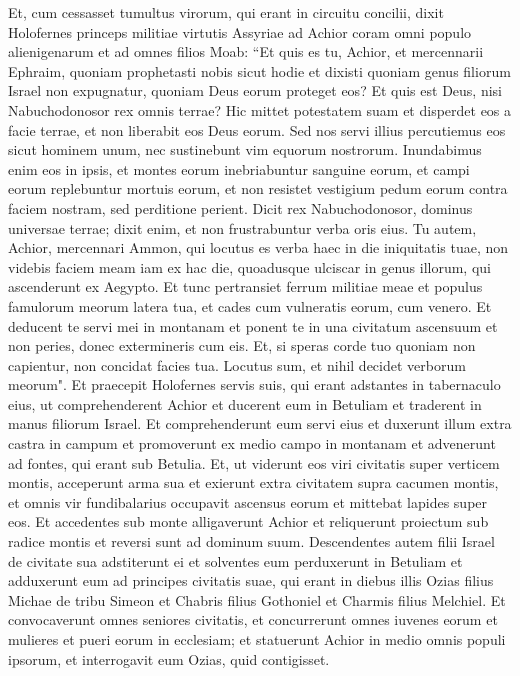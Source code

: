 \begin{biblechapter}  
\verse Et, cum cessasset tumultus virorum, qui erant in circuitu concilii, dixit Holofernes princeps militiae virtutis Assyriae ad Achior coram omni populo alienigenarum et ad omnes filios Moab: 
\verse “Et quis es tu, Achior, et mercennarii Ephraim, quoniam prophetasti nobis sicut hodie et dixisti quoniam genus filiorum Israel non expugnatur, quoniam Deus eorum proteget eos? Et quis est Deus, nisi Nabuchodonosor rex omnis terrae? Hic mittet potestatem suam et disperdet eos a facie terrae, et non liberabit eos Deus eorum. 
\verse Sed nos servi illius percutiemus eos sicut hominem unum, nec sustinebunt vim equorum nostrorum. 
\verse Inundabimus enim eos in ipsis, et montes eorum inebriabuntur sanguine eorum, et campi eorum replebuntur mortuis eorum, et non resistet vestigium pedum eorum contra faciem nostram, sed perditione perient. Dicit rex Nabuchodonosor, dominus universae terrae; dixit enim, et non frustrabuntur verba oris eius. 
\verse Tu autem, Achior, mercennari Ammon, qui locutus es verba haec in die iniquitatis tuae, non videbis faciem meam iam ex hac die, quoadusque ulciscar in genus illorum, qui ascenderunt ex Aegypto. 
\verse Et tunc pertransiet ferrum militiae meae et populus famulorum meorum latera tua, et cades cum vulneratis eorum, cum venero. 
\verse Et deducent te servi mei in montanam et ponent te in una civitatum ascensuum 
\verse et non peries, donec extermineris cum eis. 
\verse Et, si speras corde tuo quoniam non capientur, non concidat facies tua. Locutus sum, et nihil decidet verborum meorum". 
\verse Et praecepit Holofernes servis suis, qui erant adstantes in tabernaculo eius, ut comprehenderent Achior et ducerent eum in Betuliam et traderent in manus filiorum Israel. 
\verse Et comprehenderunt eum servi eius et duxerunt illum extra castra in campum et promoverunt ex medio campo in montanam et advenerunt ad fontes, qui erant sub Betulia. 
\verse Et, ut viderunt eos viri civitatis super verticem montis, acceperunt arma sua et exierunt extra civitatem supra cacumen montis, et omnis vir fundibalarius occupavit ascensus eorum et mittebat lapides super eos. 
\verse Et accedentes sub monte alligaverunt Achior et reliquerunt proiectum sub radice montis et reversi sunt ad dominum suum. 
\verse Descendentes autem filii Israel de civitate sua adstiterunt ei et solventes eum perduxerunt in Betuliam et adduxerunt eum ad principes civitatis suae, 
\verse qui erant in diebus illis Ozias filius Michae de tribu Simeon et Chabris filius Gothoniel et Charmis filius Melchiel. 
\verse Et convocaverunt omnes seniores civitatis, et concurrerunt omnes iuvenes eorum et mulieres et pueri eorum in ecclesiam; et statuerunt Achior in medio omnis populi ipsorum, et interrogavit eum Ozias, quid contigisset. 

\end{biblechapter}
